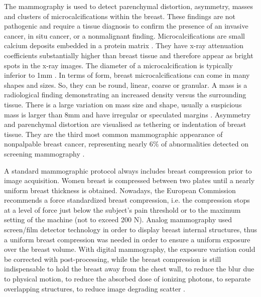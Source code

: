 The mammography is used to detect parenchymal distortion, asymmetry, masses and clusters of microcalcifications within the breast.  These findings are not pathogenic
and require a tissue diagnosis to confirm the
presence of an invasive cancer, in situ cancer, or a nonmalignant finding. Microcalcifications are small calcium deposits embedded in a protein matrix .   They have x-ray attenuation coefficients substantially higher than breast tissue and therefore appear as bright spots in the x-ray images. The diameter of a microcalcification
is typically inferior to 1mm \citep{henrot_breast_2014}. In terms of form, breast microcalcifications can come in many shapes and sizes.  So, they can be round, linear, coarse or granular.  A mass is a radiological finding demonstrating an increased density versus the surrounding tissue. There is a large variation on mass size and shape, usually a suspicious mass is larger than 8mm and have irregular or speculated margins \citep{mckenna_abnormal_1994}.  Asymmetry and parenchymal distortion are visualised as tethering or indentation of breast tissue. They are the
third most common mammographic appearance of nonpalpable
breast cancer, representing nearly 6\% of abnormalities detected on screening mammography \citep{gaur_architectural_2013}. 

A standard mammographic protocol always includes breast compression prior to image acquisition. Women breast is compressed between two plates until a nearly uniform breast thickness is obtained. Nowadays, the European Commission recommends a force standardized breast compression, i.e. the compression stops at a level of force just below the subject’s pain threshold or to the maximum setting of the machine (not to exceed 200 N). Analog mammography used screen/film detector technology in order to display breast internal structures, thus a uniform breast compression was needed in order to ensure a uniform exposure over the breast volume. With digital mammography, the exposure variation could be corrected with post-processing, while the breast compression is still indispensable to hold the breast away from the chest wall, to reduce the blur due to physical motion, to reduce the absorbed dose of ionizing photons, to separate overlapping structures, to reduce image degrading scatter \citep{kopans2007breast}.


